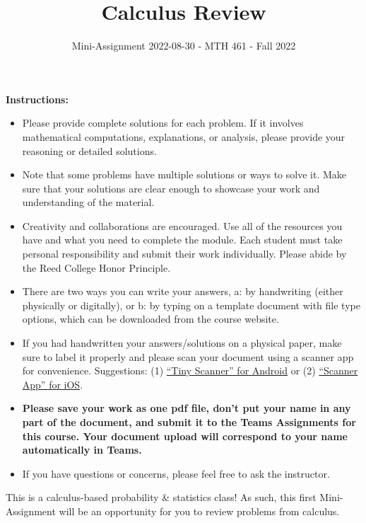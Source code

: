 \documentclass[
]{article}
\title{\textbf{Calculus Review}}
\subtitle{Mini-Assignment 2022-08-30 - MTH 461 - Fall 2022}
\author{}
\date{\vspace{-2.5em}}
\begin{document}
\maketitle

\hfill\break

\textbf{Instructions:}

\begin{itemize}
\item
  Please provide complete solutions for each problem. If it involves mathematical computations, explanations, or analysis, please provide your reasoning or detailed solutions.
\item
  Note that some problems have multiple solutions or ways to solve it. Make sure that your solutions are clear enough to showcase your work and understanding of the material.
\item
  Creativity and collaborations are encouraged. Use all of the resources you have and what you need to complete the module. Each student must take personal responsibility and submit their work individually. Please abide by the Reed College Honor Principle.
\item
  There are two ways you can write your answers, a: by handwriting (either physically or digitally), or b: by typing on a template document with file type options, which can be downloaded from the course website.
\item
  If you had handwritten your answers/solutions on a physical paper, make sure to label it properly and please scan your document using a scanner app for convenience. Suggestions: (1) \href{https://play.google.com/store/apps/details?id=com.appxy.tinyscanner\&hl=en_US\&gl=US}{``Tiny Scanner'' for Android} or (2) \href{https://apps.apple.com/us/app/scanner-app-scan-pdf-document/id595563753}{``Scanner App'' for iOS}.
\item
  \textbf{Please save your work as one pdf file, don't put your name in any part of the document, and submit it to the Teams Assignments for this course. Your document upload will correspond to your name automatically in Teams.}
\item
  If you have questions or concerns, please feel free to ask the instructor.
\end{itemize}

\newpage

This is a calculus-based probability \& statistics class! As such, this first Mini-Assignment will be an opportunity for you to review problems from calculus.
\end{document}
